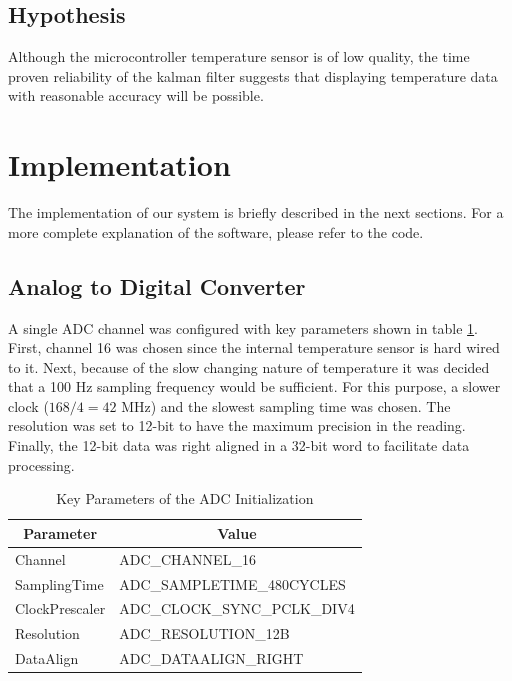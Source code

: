 \documentclass[12pt]{article}
\begin{document}
\subsection{Hypothesis}
Although the microcontroller temperature sensor is of low quality, the time proven reliability of the kalman filter suggests that displaying temperature data with reasonable accuracy will be possible. 

\section{Implementation}

The implementation of our system is briefly described in the next sections. For a more complete explanation of the software, please refer to the code. 

\subsection{Analog to Digital Converter}
A single ADC channel was configured with key parameters shown in table \ref{ADC_config}. First, channel 16 was chosen since the internal temperature sensor is hard wired to it. Next, because of the slow changing nature of temperature it was decided that a 100 Hz sampling frequency would be sufficient. For this purpose, a slower clock ($168/4 = 42$ MHz) and the slowest sampling time was chosen. The resolution was set to 12-bit to have the maximum precision in the reading. Finally, the 12-bit data was right aligned in a 32-bit word to facilitate data processing.
\begin{table}[H]
\centering
\caption{Key Parameters of the ADC Initialization}
\label{ADC_config}
\begin{tabular}{|l|l|}
\hline
\multicolumn{1}{|c|}{\textbf{Parameter}} & \multicolumn{1}{c|}{\textbf{Value}} \\ \hline
Channel                                  & ADC\_CHANNEL\_16                    \\ \hline
SamplingTime                             & ADC\_SAMPLETIME\_480CYCLES          \\ \hline
ClockPrescaler                           & ADC\_CLOCK\_SYNC\_PCLK\_DIV4        \\ \hline
Resolution                               & ADC\_RESOLUTION\_12B                \\ \hline
DataAlign                                & ADC\_DATAALIGN\_RIGHT               \\ \hline
\end{tabular}
\end{table}
\end{document}
